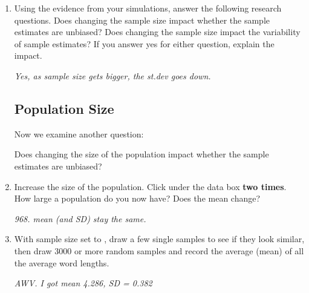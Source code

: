 \begin{enumerate}
\item Using the evidence from your simulations, answer the following
  research questions. Does changing the sample size impact whether the
  sample estimates are unbiased?  Does changing the sample size impact
  the variability of sample estimates?  If you answer yes for either
  question, explain the impact.
       \begin{students}
  \vspace{2cm}
\end{students}    
\begin{key}
   {\it  Yes, as sample size gets bigger, the st.dev goes down.}
\end{key}
 
\begin{students}
  \newpage
\end{students}

       \subsection  { Population Size}


       Now we examine another question:
       \begin{center}
         {\sf  Does changing the size of the population impact whether
           the sample estimates are unbiased?} 
       \end{center}


     \item  Increase the size of the population. 
       Click   under the data box {\bf
       two times}. 
       How large a population do you now have?  Does the mean change?
       \begin{students}
  \vspace{1cm}
\end{students}    
\begin{key}
   {\it  968. mean (and SD) stay the same.}
\end{key}

     \item With sample size set to , draw a few single
       samples to see if they look similar, then 
       draw 3000 or more random samples and record the average
       (mean) of all the average word lengths.
       \begin{students}
  \vspace{1cm}
\end{students}    
\begin{key}
   {\it  AWV. I got mean 4.286, SD = 0.382}
\end{key}


\end{enumerate}
